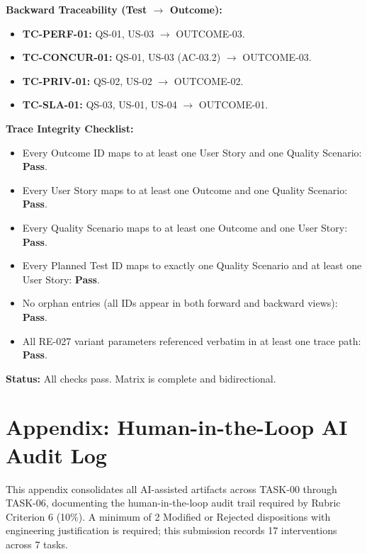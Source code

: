 \documentclass[10pt,a4paper]{article}
\begin{document}
\textbf{Backward Traceability (Test $\rightarrow$ Outcome):}

\begin{itemize}[leftmargin=*]
 \item \textbf{TC-PERF-01:} QS-01, US-03 $\rightarrow$ OUTCOME-03.
 \item \textbf{TC-CONCUR-01:} QS-01, US-03 (AC-03.2) $\rightarrow$ OUTCOME-03.
 \item \textbf{TC-PRIV-01:} QS-02, US-02 $\rightarrow$ OUTCOME-02.
 \item \textbf{TC-SLA-01:} QS-03, US-01, US-04 $\rightarrow$ OUTCOME-01.
\end{itemize}

\textbf{Trace Integrity Checklist:}

\begin{itemize}[leftmargin=*]
 \item Every Outcome ID maps to at least one User Story and one Quality Scenario: \textbf{Pass}.
 \item Every User Story maps to at least one Outcome and one Quality Scenario: \textbf{Pass}.
 \item Every Quality Scenario maps to at least one Outcome and one User Story: \textbf{Pass}.
 \item Every Planned Test ID maps to exactly one Quality Scenario and at least one User Story: \textbf{Pass}.
 \item No orphan entries (all IDs appear in both forward and backward views): \textbf{Pass}.
 \item All RE-027 variant parameters referenced verbatim in at least one trace path: \textbf{Pass}.
\end{itemize}

\textbf{Status:} All checks pass. Matrix is complete and bidirectional.

\clearpage
\appendix
\section*{Appendix: Human-in-the-Loop AI Audit Log}

This appendix consolidates all AI-assisted artifacts across TASK-00 through TASK-06, documenting the human-in-the-loop audit trail required by Rubric Criterion 6 (10\%). A minimum of 2 Modified or Rejected dispositions with engineering justification is required; this submission records 17 interventions across 7 tasks.
\end{document}

